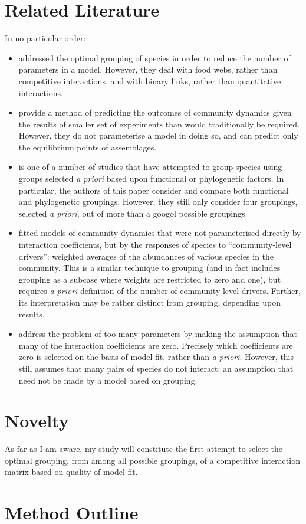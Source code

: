 \documentclass[a4paper,11pt]{article}
\begin{document}
\section{Related Literature}

In no particular order:
\begin{itemize}
	\item
		\Textcite{allesina2009food} addressed the optimal grouping of species in order to reduce the number of parameters in a model.
		However, they deal with food webs, rather than competitive interactions, and with binary links, rather than quantitative interactions.
	\item
		\Textcite{maynard2020predicting} provide a method of predicting the outcomes of community dynamics given the results of smaller set of experiments than would traditionally be required.
		However, they do not parameterise a model in doing so, and can predict only the equilibrium points of assemblages.
	\item
		\Textcite{uriarte2004spatially} is one of a number of studies that have attempted to group species using groups selected \emph{a priori} based upon functional or phylogenetic factors.
		In particular, the authors of this paper consider and compare both functional and phylogenetic groupings.
		However, they still only consider four groupings, selected \emph{a priori}, out of more than a googol possible groupings.
	\item
		\Textcite{ovaskainen2017species} fitted models of community dynamics that were not parameterised directly by interaction coefficients, but by the responses of species to ``community-level drivers'': weighted averages of the abundances of various species in the community.
		This is a similar technique to grouping (and in fact includes grouping as a subcase where weights are restricted to zero and one), but requires \emph{a priori} definition of the number of community-level drivers.
		Further, its interpretation may be rather distinct from grouping, depending upon results.
	\item
		\Textcite{weiss2021disentangling} address the problem of too many parameters by making the assumption that many of the interaction coefficients are zero.
		Precisely which coefficients are zero is selected on the basis of model fit, rather than \emph{a priori}.
		However, this still assumes that many pairs of species do not interact: an assumption that need not be made by a model based on grouping.
\end{itemize}

\section{Novelty}

As far as I am aware, my study will constitute the first attempt to select the optimal grouping, from among all possible groupings, of a competitive interaction matrix based on quality of model fit.

\section{Method Outline}

\FloatBarrier
\printbibliography
\end{document}
